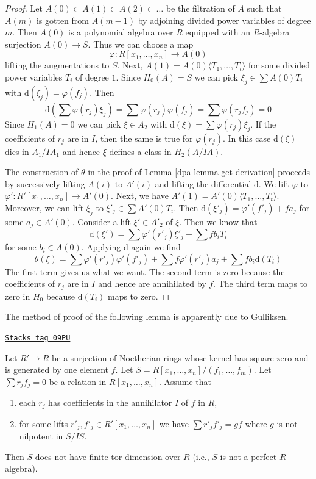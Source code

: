 \begin{proof}

Let $A(0) \subset A(1) \subset A(2) \subset \ldots$ be the filtration
of $A$ such that $A(m)$ is gotten from $A(m - 1)$ by adjoining divided
power variables of degree $m$. Then $A(0)$ is a polynomial algebra
over $R$ equipped with an $R$-algebra surjection $A(0) \to S$.
Thus we can choose a map
$$
\varphi : R[x_1, \ldots, x_n] \to A(0)
$$
lifting the augmentations to $S$.
Next, $A(1) = A(0)\langle T_1, \ldots, T_t \rangle$ for some divided
power variables $T_i$ of degree $1$. Since $H_0(A) = S$ we
can pick $\xi_j \in \sum A(0)T_i$ with $\text{d}(\xi_j) = \varphi(f_j)$.
Then
$$
\text{d}\left(\sum \varphi(r_j) \xi_j\right) =
\sum  \varphi(r_j) \varphi(f_j) =  \sum \varphi(r_jf_j) = 0
$$
Since $H_1(A) = 0$ we can pick $\xi \in A_2$ with
$\text{d}(\xi) = \sum \varphi(r_j) \xi_j$.
If the coefficients of $r_j$ are in $I$, then the same
is true for $\varphi(r_j)$. In this case
$\text{d}(\xi)$ dies in $A_1/IA_1$ and
hence $\xi$ defines a class in $H_2(A/IA)$.

\medskip\noindent
The construction of $\theta$ in the proof of Lemma \ref{dpa-lemma-get-derivation}
proceeds by successively lifting $A(i)$ to $A'(i)$ and lifting the
differential $\text{d}$. We lift $\varphi$
to $\varphi' : R'[x_1, \ldots, x_n] \to A'(0)$.
Next, we have $A'(1) = A'(0)\langle T_1, \ldots, T_t\rangle$.
Moreover, we can lift $\xi_j$ to $\xi'_j \in \sum A'(0)T_i$.
Then $\text{d}(\xi'_j) = \varphi'(f'_j) + f a_j$ for some
$a_j \in A'(0)$.
Consider a lift $\xi' \in A'_2$ of $\xi$.
Then we know that
$$
\text{d}(\xi') = \sum \varphi'(r'_j)\xi'_j + \sum fb_iT_i
$$
for some $b_i \in A(0)$. Applying $\text{d}$ again we find
$$
\theta(\xi) = \sum \varphi'(r'_j)\varphi'(f'_j) +
\sum f \varphi'(r'_j) a_j + \sum fb_i \text{d}(T_i)
$$
The first term gives us what we want. The second term is zero
because the coefficients of $r_j$ are in $I$ and hence are
annihilated by $f$. The third term maps to zero in $H_0$
because $\text{d}(T_i)$ maps to zero.
\end{proof}

The method of proof of the following lemma is apparently due to Gulliksen.

\begin{lemma}
\label{dpa-lemma-not-finite-pd}
\href{https://stacks.math.columbia.edu/tag/09PU}{\texttt{Stacks tag 09PU}}

Let $R' \to R$ be a surjection of Noetherian rings whose kernel has square
zero and is generated by one element $f$. Let
$S = R[x_1, \ldots, x_n]/(f_1, \ldots, f_m)$.
Let $\sum r_j f_j = 0$ be a relation in $R[x_1, \ldots, x_n]$.
Assume that
\begin{enumerate}
\item each $r_j$ has coefficients in the annihilator $I$ of $f$ in $R$,
\item for some lifts $r'_j, f'_j \in R'[x_1, \ldots, x_n]$ we have
$\sum r'_j f'_j = gf$ where $g$ is not nilpotent in $S/IS$.
\end{enumerate}
Then $S$ does not have finite tor dimension over $R$ (i.e., $S$ is not
a perfect $R$-algebra).
\end{lemma}

